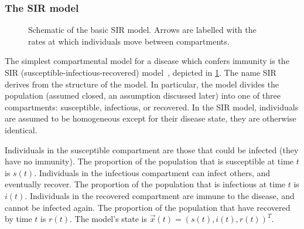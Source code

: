 \documentclass[thesis.tex]{subfiles}
\begin{document}
\subsubsection{The SIR model} \label{SEIR:sec:SIR}

\begin{figure}[h]
  \caption[The SIR model]{Schematic of the basic SIR model. Arrows are labelled with the rates at which individuals move between compartments.}
  \label{SEIR:fig:SIR}
\end{figure}

The simplest compartmental model for a disease which confers immunity is the SIR (susceptible-infectious-recovered) model~\autocite[15]{keelingModeling}, depicted in \cref{SEIR:fig:SIR}.
The name SIR derives from the structure of the model.
In particular, the model divides the population (assumed closed, an assumption discussed later) into one of three compartments: susceptible, infectious, or recovered.
In the SIR model, individuals are assumed to be homogeneous except for their disease state, \ie they are otherwise identical.

Individuals in the susceptible compartment are those that could be infected (they have no immunity).
The proportion of the population that is susceptible at time $t$ is $s(t)$.
Individuals in the infectious compartment can infect others, and eventually recover.
The proportion of the population that is infectious at time $t$ is $i(t)$.
Individuals in the recovered compartment are immune to the disease, and cannot be infected again.
The proportion of the population that have recovered by time $t$ is $r(t)$.
The model's state is $\vec{x}(t) = (s(t), i(t), r(t))^T$.
\end{document}
